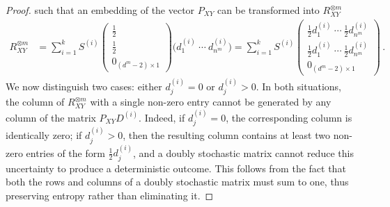 \documentclass[aps,pra,11pt,onecolumn,nofootinbib,tightenlines]{revtex4-2}
\theoremstyle{definition}
\begin{document}
\begin{proof}
such that an embedding of the vector \( P_{XY} \) can be transformed into \( R_{XY}^{\otimes m} \) 
\begin{align}\label{eq:apu3}
R_{XY}^{\otimes m}&=\sum_{i=1}^k S^{(i)}
\begin{pmatrix}
    \frac{1}{2}\\
    \frac{1}{2} \\
    0_{(d^m-2)\times 1}
\end{pmatrix}
\big(d^{(i)}_{1}\ \cdots\ d^{(i)}_{n^m}\big)=\sum_{i=1}^k S^{(i)} 
\begin{pmatrix}
    \frac{1}{2}d^{(i)}_{1}\ \cdots\ \frac{1}{2}d^{(i)}_{n^m} \\
   \frac{1}{2} d^{(i)}_{1}\ \cdots\ \frac{1}{2}d^{(i)}_{n^m} \\
   0_{(d^m-2) \times 1}
\end{pmatrix} \,.
\end{align}
We now distinguish two cases: either \( d_j^{(i)} = 0 \) or \( d_j^{(i)} > 0 \). In both situations, the column of \( R_{XY}^{\otimes m} \) with a single non-zero entry cannot be generated by any column of the matrix \( P_{XY} D^{(i)} \). Indeed, if \( d_j^{(i)} = 0 \), the corresponding column is identically zero; if \( d_j^{(i)} > 0 \), then the resulting column contains at least two non-zero entries of the form \( \frac{1}{2} d_j^{(i)} \), and a doubly stochastic matrix cannot reduce this uncertainty to produce a deterministic outcome. This follows from the fact that both the rows and columns of a doubly stochastic matrix must sum to one, thus preserving entropy rather than eliminating it.


\end{proof}
\end{document}
